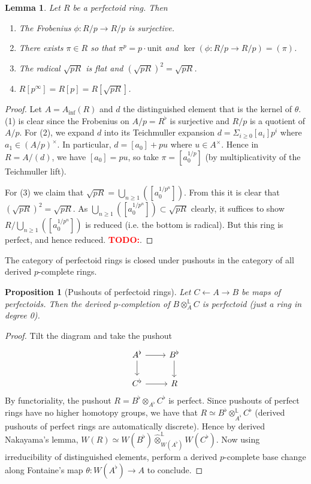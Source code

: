 \documentclass[12pt]{amsproc}
\newtheorem*{prop}{Proposition}
\newtheorem{lemma}{Lemma}
\theoremstyle{definition}
\newcommand{\tensor}{\otimes}
\newcommand{\htpyeq}{\simeq}
\newcommand{\ra}{\rightarrow}
\DeclareMathOperator{\DerivedL}{\mathbb{L}}
\newcommand{\todo}[1]{\textcolor{red}{\textbf{TODO:}\text{[#1]}}}
\begin{document}
\begin{lemma} Let $R$ be a perfectoid ring. Then
\begin{enumerate}
\item The Frobenius $\phi:R/p \ra R/p$ is surjective.
\item There exists $\pi\in R$ so that $\pi^p=p\cdot\text{unit}$ and $\ker(\phi:R/p\ra R/p)=(\pi)$.
\item The radical $\sqrt{pR}$ is flat and $(\sqrt{pR})^2=\sqrt{pR}$.
\item $R[p^\infty]=R[p]=R[\sqrt{pR}]$.
\end{enumerate}
\end{lemma}
\begin{proof}
Let $A=A_\text{inf}(R)$ and $d$ the distinguished element that is the kernel of $\theta$. (1) is clear since the Frobenius on $A/p=R^\flat$ is surjective and $R/p$ is a quotient of $A/p$. For (2), we expand $d$ into its Teichmuller expansion $d=\Sigma_{i\ge 0}[a_i]p^i$ where $a_1\in(A/p)^\times$. In particular, $d=[a_0]+pu$ where $u\in A^\times$. Hence in $R=A/(d)$, we have $[a_0]=pu$, so take $\pi=[a_0^{1/p}]$ (by multiplicativity of the Teichmuller lift).

For (3) we claim that $\sqrt{pR}=\bigcup_{n\ge 1}([a_0^{1/p^n}])$. From this it is clear that $(\sqrt{pR})^2=\sqrt{pR}$. As $\bigcup_{n\ge 1}([a_0^{1/p^n}])\subset\sqrt{pR}$ clearly, it suffices to show $R/\bigcup_{n\ge 1}([a_0^{1/p^n}])$ is reduced (i.e. the bottom is radical). But this ring is perfect, and hence reduced. \todo{check flatness}.
\end{proof}

The category of perfectoid rings is closed under pushouts in the category of all derived $p$-complete rings.

\begin{prop}[Pushouts of perfectoid rings] Let $C\leftarrow A \ra B$ be maps of perfectoids. Then the derived $p$-completion of $B\otimes^{\DerivedL}_A C$ is perfectoid (just a ring in degree 0). 
\end{prop}
\begin{proof}
Tilt the diagram and take the pushout
\[\begin{tikzcd}
A^\flat\arrow[r]\arrow[d]&B^\flat\arrow[d]\\
C^\flat\arrow[r]&R
\end{tikzcd}\]
By functoriality, the pushout $R=B^\flat\tensor_{A^\flat}C^\flat$ is perfect. Since pushouts of perfect rings have no higher homotopy groups, we have that $R\htpyeq B^\flat\tensor^{\DerivedL}_{A^\flat}C^\flat$ (derived pushouts of perfect rings are automatically discrete). Hence by derived Nakayama's lemma, $W(R)\htpyeq W(B^\flat)\widehat{\tensor}^{\DerivedL}_{W(A^\flat)}W(C^\flat)$. Now using irreducibility of distinguished elements, perform a derived $p$-complete base change along Fontaine's map $\theta:W(A^\flat)\ra A$ to conclude.
\end{proof}
\end{document}
